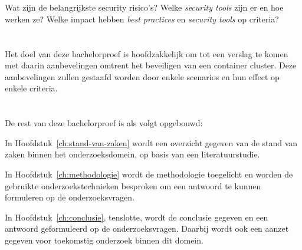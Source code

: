 \section{}
\label{sec:onderzoeksvraag}


Wat zijn de belangrijkste security risico's? Welke \textit{security tools} zijn er en hoe werken ze? Welke impact hebben \textit{best practices} en \textit{security tools} op criteria?

\section{}
\label{sec:onderzoeksdoelstelling}


Het doel van deze bachelorproef is hoofdzakkelijk om tot een verslag te komen met daarin aanbevelingen omtrent het beveiligen van een container cluster. Deze aanbevelingen zullen gestaafd worden door enkele scenarios en hun effect op enkele criteria.

\section{}
\label{sec:opzet-bachelorproef}


De rest van deze bachelorproef is als volgt opgebouwd:

In Hoofdstuk~\ref{ch:stand-van-zaken} wordt een overzicht gegeven van de stand van zaken binnen het onderzoeksdomein, op basis van een literatuurstudie.

In Hoofdstuk~\ref{ch:methodologie} wordt de methodologie toegelicht en worden de gebruikte onderzoekstechnieken besproken om een antwoord te kunnen formuleren op de onderzoeksvragen.


In Hoofdstuk~\ref{ch:conclusie}, tenslotte, wordt de conclusie gegeven en een antwoord geformuleerd op de onderzoeksvragen. Daarbij wordt ook een aanzet gegeven voor toekomstig onderzoek binnen dit domein.
